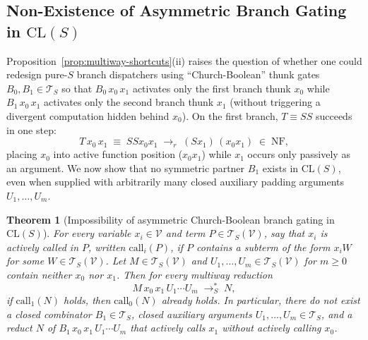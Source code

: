 \documentclass[11pt,reqno]{amsart}
\numberwithin{equation}{section}
\theoremstyle{plain}
\newtheorem{theorem}{Theorem}[section]
\theoremstyle{definition}
\theoremstyle{remark}
\newcommand{\CLS}{\mathrm{CL}(S)}
\newcommand{\TS}{\mathcal{T}_S}
\newcommand{\TSV}{\mathcal{T}_S(\mathcal{V})}
\newcommand{\NF}{\mathrm{NF}}
\newcommand{\redSs}{\to_S^*}
\begin{document}
\subsection{Non-Existence of Asymmetric Branch Gating in \texorpdfstring{$\CLS$}{CL(S)}}\label{subsec:no-church-bool}

Proposition~\ref{prop:multiway-shortcuts}(ii) raises the question of whether one could redesign pure-$S$ branch dispatchers using ``Church-Boolean'' thunk gates $B_0, B_1 \in \TS$ so that $B_0\,x_0\,x_1$ activates only the first branch thunk $x_0$ while $B_1\,x_0\,x_1$ activates only the second branch thunk $x_1$ (without triggering a divergent computation hidden behind $x_0$). On the first branch, $T \equiv S S$ succeeds in one step:
\[
  T\,x_0\,x_1 \;\equiv\; S S x_0 x_1 \;\to_r\; (S x_1)\,(x_0 x_1) \;\in\; \NF,
\]
placing $x_0$ into active function position ($x_0 x_1$) while $x_1$ occurs only passively as an argument. We now show that no symmetric partner $B_1$ exists in $\CLS$, even when supplied with arbitrarily many closed auxiliary padding arguments $U_1, \dots, U_m$.

\begin{theorem}[Impossibility of asymmetric Church-Boolean branch gating in $\CLS$]\label{thm:no-church-bool}
For every variable $x_i \in \mathcal{V}$ and term $P \in \TSV$, say that $x_i$ is \emph{actively called} in $P$, written $\mathrm{call}_i(P)$, if $P$ contains a subterm of the form $x_i W$ for some $W \in \TSV$. Let $M \in \TSV$ and $U_1, \dots, U_m \in \TSV$ for $m \ge 0$ contain neither $x_0$ nor $x_1$. Then for every multiway reduction
\[
  M\,x_0\,x_1\,U_1\cdots U_m \;\redSs\; N,
\]
if $\mathrm{call}_1(N)$ holds, then $\mathrm{call}_0(N)$ already holds. In particular, there do not exist a closed combinator $B_1 \in \TS$, closed auxiliary arguments $U_1, \dots, U_m \in \TS$, and a reduct $N$ of $B_1\,x_0\,x_1\,U_1\cdots U_m$ that actively calls $x_1$ without actively calling $x_0$.
\end{theorem}
\end{document}
